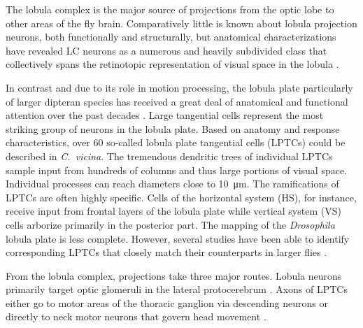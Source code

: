 The lobula complex is the major source of projections from the optic lobe to other areas of the fly brain. Comparatively little is known about lobula projection neurons, both functionally and structurally, but anatomical characterizations have revealed LC neurons as a numerous and heavily subdivided class that collectively spans the retinotopic representation of visual space in the lobula \citet{Otsuna:2006aa}.

In contrast and due to its role in motion processing, the lobula plate particularly of larger dipteran species has received a great deal of anatomical and functional attention over the past decades \citep[for thorough reviews, see][]{Borst:2002iw,Borst:2010fk}. Large tangential cells represent the most striking group of neurons in the lobula plate. Based on anatomy and response characteristics, over 60 so-called lobula plate tangential cells (LPTCs) could be described in \textit{C.\ vicina}. The tremendous dendritic trees of individual LPTCs sample input from hundreds of columns and thus large portions of visual space. Individual processes can reach diameters close to \SI{10}{\micro\meter}. The ramifications of LPTCs are often highly specific. Cells of the horizontal system (HS), for instance, receive input from frontal layers of the lobula plate while vertical system (VS) cells arborize primarily in the posterior part. The mapping of the \textit{Drosophila} lobula plate is less complete. However, several studies have been able to identify corresponding LPTCs that closely match their counterparts in larger flies \citep{Fischbach:1989uw,Scott:2002aa,Joesch:2008fo,Schnell:2010ik}.

From the lobula complex, projections take three major routes. Lobula neurons primarily target optic glomeruli in the lateral protocerebrum \citep{Mu:2012aa}. Axons of LPTCs either go to motor areas of the thoracic ganglion via descending neurons or directly to neck motor neurons that govern head movement \citep{Strausfeld:1985aa,Borst:2014kl}.

